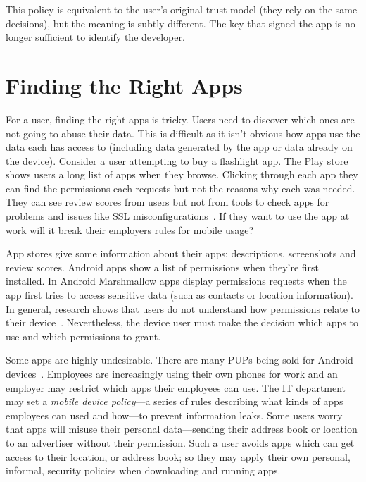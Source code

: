\documentclass[thesis.tex]{subfiles}
\begin{document}
This policy is equivalent to the user's original trust model (they rely on the
same decisions), but the meaning is subtly different. The key that signed the
app is no longer sufficient to identify the developer.

\section{Finding the Right Apps}

For a user, finding the right apps is tricky.  Users need to discover
which ones are not going to abuse their data.  This is difficult as it
isn't obvious how apps use the data each has access to (including data
generated by the app or data already on the device).  Consider a user
attempting to buy a flashlight app.  The Play store shows users a long
list of apps when they browse.  Clicking through each app they can
find the permissions each requests but not the reasons why each was
needed.  They can see review scores from users but not from tools to
check apps for problems and issues like SSL
misconfigurations~\cite{fahl_why_2012}.  If they want to use the app
at work will it break their employers rules for mobile usage?

App stores give some information about their apps; descriptions,
screenshots and review scores.  Android apps show a list of
permissions when they're first installed.  In Android Marshmallow apps
display permissions requests when the app first tries to access
sensitive data (such as contacts or location information).  In
general, research shows that users do not understand how permissions
relate to their device~\cite{felt_android_2012,thompson_when_2013}.
Nevertheless, the device user must make the decision which apps to use
and which permissions to grant.

Some apps are highly undesirable.  There are many \acp{PUP} being sold
for Android
devices~\cite{truong_company_2014,vanja_svajcer_classifying_2013}.
Employees are increasingly using their own phones for work and an
employer may restrict which apps their employees can use.  The IT
department may set a \emph{mobile device policy}---a series of rules
describing what kinds of apps employees can used and how---to prevent
information leaks.  Some users worry that apps will misuse their
personal data---sending their address book or location to an
advertiser without their permission.  Such a user avoids apps which
can get access to their location, or address book; so they may apply their own
personal, informal, security policies when downloading and running apps.
\end{document}
